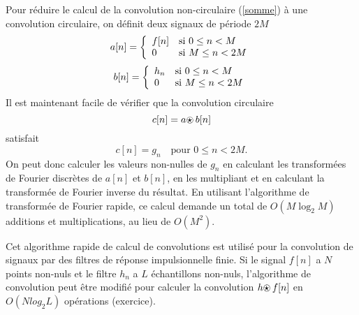 Pour r\'eduire le calcul de
la convolution non-circulaire (\ref{somme})
\`a une convolution circulaire, on d\'efinit deux signaux
de p\'eriode $2M$
\begin{equation}
a [ n  ] =
   \left \{ \begin{array}{ll}
            f[n]   & \mbox{si $0 \leq n < M$}\\
            0  & \mbox{si $ M \leq n < 2M$}
            \end{array}
   \right.
\end{equation}
\begin{equation}
b [ n  ] =
   \left \{ \begin{array}{ll}
            h_n &  \mbox{si $ 0 \leq n < M$}\\
            0  & \mbox{si $M \leq n < 2M$}
            \end{array}
   \right.
\end{equation}
Il est maintenant facile de v\'erifier que la convolution circulaire
\[
c[n] = a {\mbox{$\odot \!\!\!\!\star~$}} b [n]
\]
satisfait
\begin{equation}
c [ n  ] =  g_n   \mbox{~~~pour } 0 \leq n < 2M .
\end{equation}
On peut donc calculer les valeurs non-nulles de
$g_n$ en calculant les transform\'ees de Fourier discr\`etes
de $a[n]$ et $b[n]$, en les multipliant et
en calculant la transform\'ee de Fourier inverse du r\'esultat.
En utilisant l'algorithme de transform\'ee de Fourier rapide,
ce calcul demande un total de $O(M \log_2 M)$ additions
et multiplications, au lieu de $O(M^2)$.

Cet algorithme rapide de calcul de convolutions est utilis\'e
pour la convolution de signaux par des filtres de r\'eponse
impulsionnelle finie. Si le signal $f[n]$ a $N$ points
non-nuls et le filtre $h_n$ a $L$ \'echantillons non-nuls,
l'algorithme de convolution peut \^etre
modifi\'e pour calculer la convolution $h {\mbox{$\odot \!\!\!\!\star~$}} f[n]$
en $O(N log_2 L )$ op\'erations (exercice).
%








